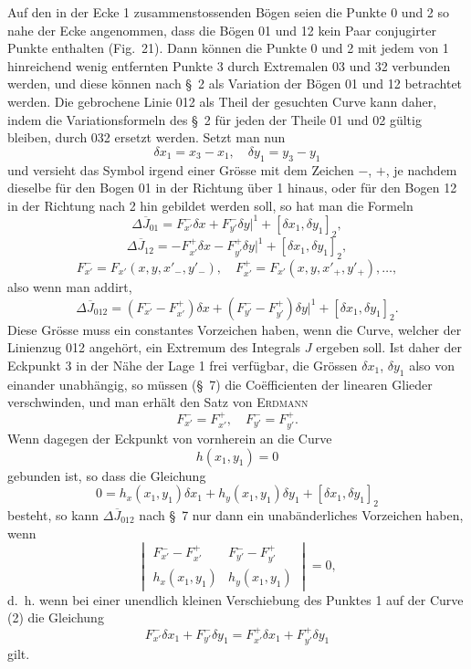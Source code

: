 \documentclass[11pt,a4paper,leqno]{article}
\begin{document}
Auf den in der Ecke 1 zusammenstossenden Bögen seien die Punkte 0 und 2 so nahe der Ecke angenommen, dass die Bögen 01 und 12 kein Paar conjugirter Punkte enthalten (Fig.~21). Dann können die Punkte 0 und 2 mit jedem von 1 hinreichend wenig entfernten Punkte 3 durch Extremalen 03 und 32 verbunden werden, und diese können nach \S~2 als Variation der Bögen 01 und 12 betrachtet werden. Die gebrochene Linie 012 als Theil der gesuchten Curve kann daher, indem die Variationsformeln des \S~2 für jeden der Theile 01 und 02 gültig bleiben, durch 032 ersetzt werden. Setzt man nun
\[
\delta x_1=x_3-x_1,\quad \delta y_1=y_3-y_1
\]
und versieht das Symbol irgend einer Grösse mit dem Zeichen $-$, $+$, je nachdem dieselbe für den Bogen 01 in der Richtung über 1 hinaus, oder für den Bogen 12 in der Richtung nach 2 hin gebildet werden soll, so hat man die Formeln
\[
\Delta \overline{J}_{01}=F_{x'}^-\delta x+F_{y'}^-\delta y\big|^1+[\delta x_1,\delta y_1]_2,
\]
\[
\Delta \overline{J}_{12}=-F_{x'}^+\delta x-F_{y'}^+\delta y\big|^1+[\delta x_1,\delta y_1]_2,
\]
\[
F_{x'}^- =F_{x'}(x,y,x'_{-},y'_{-}),\quad
F_{x'}^+=F_{x'}(x,y,x'_{+},y'_{+}),\ldots,
\]
also wenn man addirt,
\[
\Delta\overline{J}_{012}=(F_{x'}^- -F_{x'}^+)\delta x+(F_{y'}^- -F_{y'}^+)\delta y\big|^1+[\delta x_1,\delta y_1]_2.
\]
Diese Grösse muss ein constantes Vorzeichen haben, wenn die Curve, welcher der Linienzug 012 angehört, ein Extremum des Integrals $J$ ergeben soll. Ist daher der Eckpunkt 3 in der Nähe der Lage 1 frei verfügbar, die Grössen $\delta x_1$, $\delta y_1$ also von einander unabhängig, so müssen (\S~7) die Coëfficienten der linearen Glieder verschwinden, und man erhält den Satz von \textsc{Erdmann}
\begin{equation}\tag{1}
F_{x'}^- =F_{x'}^+,
\quad F_{y'}^- =F_{y'}^+.
\end{equation}
Wenn dagegen der Eckpunkt von vornherein an die Curve
\begin{equation}\tag{2}
h(x_1,y_1)=0
\end{equation}
gebunden ist, so dass die Gleichung
\[
0=h_x(x_1,y_1)\delta x_1+h_y(x_1,y_1)\delta y_1+[\delta x_1,\delta y_1]_2
\]
besteht, so kann $\Delta\overline{J}_{012}$ nach \S~7 nur dann ein unabänderliches Vorzeichen haben, wenn
\[
\begin{vmatrix}
F_{x'}^- -F_{x'}^+&F_{y'}^- -F_{y'}^+\\
h_x(x_1,y_1)&h_y(x_1,y_1)
\end{vmatrix}=0,
\]
d.~h. wenn bei einer unendlich kleinen Verschiebung des Punktes 1 auf der Curve (2) die Gleichung
\begin{equation}\tag{3}
F_{x'}^-\delta x_1+F_{y'}^-\delta y_1=F_{x'}^+\delta x_1+F_{y'}^+\delta y_1
\end{equation}
gilt.
\end{document}
